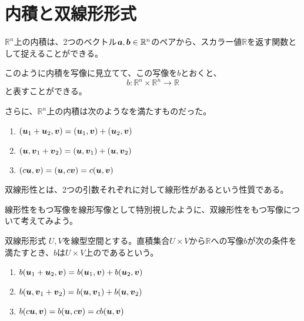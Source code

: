 \documentclass[../../../topic_linear-algebra]{subfiles}
\begin{document}
\sectionline
\section{内積と双線形形式}

$\mathbb{R}^n$上の内積は、2つのベクトル$\vb*{a}, \vb*{b} \in \mathbb{R}^n$のペアから、スカラー値$\mathbb{R}$を返す関数として捉えることができる。

このように内積を写像に見立てて、この写像を$b$とおくと、
\begin{equation*}
  b \colon \mathbb{R}^n \times \mathbb{R}^n \to \mathbb{R}
\end{equation*}
と表すことができる。

\br

さらに、$\mathbb{R}^n$上の内積は次のようなを満たすものだった。

\begin{enumerate}[label=\romanlabel]
  \item $(\vb*{u}_1 + \vb*{u}_2, \vb*{v}) = ( \vb*{u}_1, \vb*{v}) + ( \vb*{u}_2, \vb*{v})$
  \item $(\vb*{u}, \vb*{v}_1 + \vb*{v}_2) = (\vb*{u}, \vb*{v}_1) + (\vb*{u}, \vb*{v}_2)$
  \item $(c\vb*{u}, \vb*{v}) = (\vb*{u}, c\vb*{v}) = c(\vb*{u}, \vb*{v})$
\end{enumerate}

双線形性とは、2つの引数それぞれに対して線形性があるという性質である。

線形性をもつ写像を線形写像として特別視したように、双線形性をもつ写像について考えてみよう。

\begin{definition}{双線形形式}
  $U,V$を線型空間とする。直積集合$U \times V$から$\mathbb{R}$への写像$b$が次の条件を満たすとき、$b$は$U \times V$上のであるという。
  \begin{enumerate}[label=\romanlabel]
    \item $b(\vb*{u}_1 + \vb*{u}_2, \vb*{v}) = b(\vb*{u}_1, \vb*{v}) + b(\vb*{u}_2, \vb*{v})$
    \item $b(\vb*{u}, \vb*{v}_1 + \vb*{v}_2) = b(\vb*{u}, \vb*{v}_1) + b(\vb*{u}, \vb*{v}_2)$
    \item $b(c\vb*{u}, \vb*{v}) = b(\vb*{u}, c\vb*{v}) = cb(\vb*{u}, \vb*{v})$
  \end{enumerate}
\end{definition}
\end{document}
